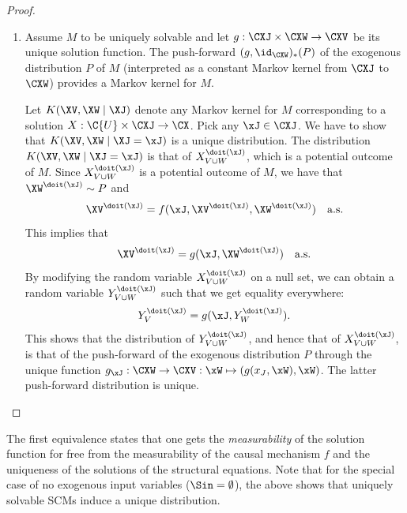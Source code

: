 \begin{proof}
\begin{enumerate}
\item
  Assume $M$ to be uniquely solvable and let $g : \CXJ \times \CXW \to \CXV$ be its unique solution function.
  The push-forward $(g,\id_{\CXW})_*(P)$ of the exogenous distribution $P$ of $M$ (interpreted as a constant 
  Markov kernel from $\CXJ$ to $\CXW$) provides a Markov kernel for $M$.
  
  Let $K(\XV,\XW \mid \XJ)$ denote any Markov kernel for $M$ corresponding to a solution $X : \C{U} \times \CXJ \to \CX$.
  Pick any $\xJ\in\CXJ$. 
  We have to show that $K(\XV,\XW \mid \XJ=\xJ)$ is a unique distribution.
  The distribution $K(\XV,\XW \mid \XJ=\xJ)$ is that of $X_{V\cup W}^{\doit(\xJ)}$, which is a potential outcome of $M$.
  Since $X_{V\cup W}^{\doit(\xJ)}$ is a potential outcome of $M$, we have that $\XW^{\doit(\xJ)} \sim P$ and
    $$\XV^{\doit(\xJ)} = f(\xJ,\XV^{\doit(\xJ)},\XW^{\doit(\xJ)}) \quad\text{a.s.}$$
  This implies that
    $$\XV^{\doit(\xJ)} = g(\xJ,\XW^{\doit(\xJ)}) \quad\text{a.s.}$$
   By modifying the random variable $X_{V\cup W}^{\doit(\xJ)}$ on a null set, we can obtain a random variable $Y_{V\cup W}^{\doit(\xJ)}$ such that we get equality everywhere:
  $$Y_V^{\doit(\xJ)} = g(\xJ,Y_W^{\doit(\xJ)}).$$
  This shows that the distribution of $Y_{V\cup W}^{\doit(\xJ)}$, and hence that of $X_{V\cup W}^{\doit(\xJ)}$, 
  is that of the push-forward of the exogenous distribution $P$ through the unique function
  $g_{\xJ} : \CXW \to \CXV : \xW \mapsto (g(x_J,\xW),\xW)$.
  The latter push-forward distribution is unique.
  \end{enumerate}
\end{proof}
The first equivalence states that one gets the \emph{measurability}
of the solution function for free from the measurability of the causal mechanism $f$ and 
the uniqueness of the solutions of the structural equations.
Note that for the special case of no exogenous input variables ($\Sin = \emptyset$), 
the above shows that uniquely solvable SCMs induce a unique distribution.

